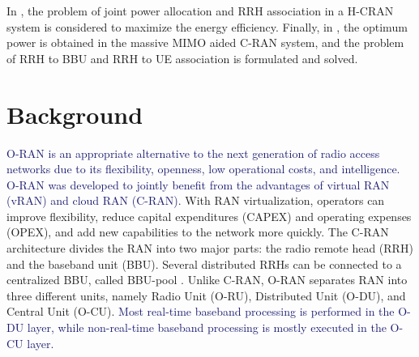 \documentclass[lettersize,journal]{IEEEtran}
\begin{document}
In \cite{ali2019energy,ali2019energy1,ali2018joint}, the problem of joint power allocation and RRH association in a H-CRAN system is considered to maximize the energy efficiency.
Finally, in \cite{amani2019power}, the optimum power is obtained in the massive MIMO aided C-RAN system, and the problem of RRH to BBU and RRH to UE association is formulated and solved. 

\section{Background}\label{BG}
\textcolor{MidnightBlue}{O-RAN is an appropriate alternative to the next generation of radio access networks due to its flexibility, openness, low operational costs, and intelligence. O-RAN was developed to jointly benefit from the advantages of virtual RAN (vRAN) and cloud RAN (C-RAN).} With RAN virtualization, operators can improve flexibility, reduce capital expenditures (CAPEX) and operating expenses (OPEX), and add new capabilities to the network more quickly. The C-RAN architecture divides the RAN into two major parts: the radio remote head (RRH) and the baseband unit (BBU). Several distributed RRHs can be connected to a centralized BBU, called BBU-pool \cite{han2019research}. Unlike C-RAN, O-RAN separates RAN into three different units, namely Radio Unit (O-RU), Distributed Unit (O-DU), and Central Unit (O-CU).
\textcolor{MidnightBlue}{ Most real-time baseband processing is performed in the O-DU layer, while non-real-time baseband processing is mostly executed in the O-CU layer.}
\end{document}
